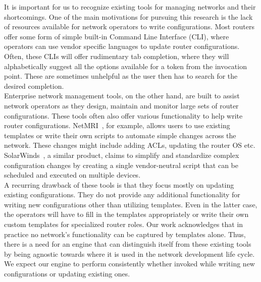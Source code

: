 \documentclass[../thesis.tex]{subfiles}
\begin{document}
It is important for us to recognize existing tools for managing networks and their shortcomings. One of the main motivations for pursuing this research is the lack of resources available for network operators to write configurations. Most routers offer some form of simple built-in Command Line Interface (CLI), where operators can use vendor specific languages to update router configurations. Often, these CLIs will offer rudimentary tab completion, where they will alphabetically suggest all the options available for a token from the invocation point. These are sometimes unhelpful as the user then has to search for the desired completion.\\ 

Enterprise network management tools, on the other hand, are built to assist network operators as they design, maintain and monitor large sets of router configurations. These tools often also offer various functionality to help write router configurations. NetMRI~\cite{netmri}, for example, allows users to use existing templates or write their own scripts to automate simple changes across the network. These changes might include adding ACLs, updating the router OS etc. SolarWinds~\cite{solarwinds}, a similar product, claims to simplify and standardize complex configuration changes by creating a single vendor-neutral script that can be scheduled and executed on multiple devices.\\

A recurring drawback of these tools is that they focus mostly on updating existing configurations. They do not provide any additional functionality for writing new configurations other than utilizing templates. Even in the latter case, the operators will have to fill in the templates appropriately or write their own custom templates for specialized router roles. Our work acknowledges that in practice no network's functionality can be captured by templates alone. Thus, there is a need for an engine that can distinguish itself from these existing tools by being agnostic towards where it is used in the network development life cycle. We expect our engine to perform consistently whether invoked while writing new configurations or updating existing ones.
\end{document}
